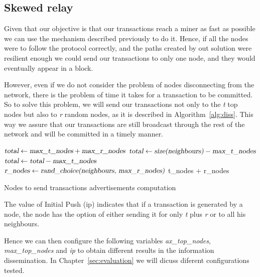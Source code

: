 \documentclass{dads}   %
\begin{document}
\subsection{Skewed relay}
\label{sec:sr}
Given that our objective is that our transactions reach a miner as fast as possible we can use the mechanism described previously to do it. Hence, if all the nodes were to follow the protocol correctly, and the paths created by out solution were resilient enough we could send our transactions to only one node, and they would eventually appear in a block.

However, even if we do not consider the problem of nodes disconnecting from the network, there is the problem of time it takes for a transaction to be committed. So to solve this problem, we will send our transactions not only to the \textit{t} top nodes but also to \textit{r} random nodes, as it is described in Algorithm~\ref{alg:diss}. This way we assure that our transactions are still broadcast through the rest of the network and will be committed in a timely manner.

\begin{algorithm}[t]
\begin{algorithmic}[1]
\EndIf
\State $\textsl{total} \gets \textsl{max\_t\_nodes} + \textsl{max\_r\_nodes}$
	\State $\textsl{total} \gets \textsl{size(neighbours)} - \textsl{max\_t\_nodes}$
\Else
	\State $\textsl{total} \gets \textsl{total} - \textsl{max\_t\_nodes}$
    \EndIf
{}
	\State $\textsl{r\_nodes} \gets \textsl{rand\_choice(neighbours, max\_r\_nodes)}$
    \EndIf
\State \Return t\_nodes + r\_nodes
\EndFunction
\end{algorithmic}
\caption{Nodes to send transactions advertisements computation}
\label{alg:diss}
\end{algorithm}

The value of Initial Push (ip) indicates that if a transaction is generated by a node, the node has the option of either sending it for only \textit{t} plus \textit{r} or to all his neighbours.

Hence we can then configure the following variables \textsl{ax\_top\_nodes}, \textsl{max\_top\_nodes} and \textsl{ip} to obtain different results in the information dissemination. In Chapter~\ref{sec:evaluation} we will dicuss diferent configurations tested.
\end{document}
